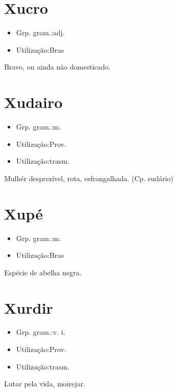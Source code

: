 \section{Xucro}
\begin{itemize}
\item {Grp. gram.:adj.}
\end{itemize}
\begin{itemize}
\item {Utilização:Bras}
\end{itemize}
Bravo, ou ainda não domesticado.
\section{Xudairo}
\begin{itemize}
\item {Grp. gram.:m.}
\end{itemize}
\begin{itemize}
\item {Utilização:Prov.}
\end{itemize}
\begin{itemize}
\item {Utilização:trasm.}
\end{itemize}
Mulhér desprezível, rota, esfrangalhada.
(Cp. \textunderscore sudário\textunderscore )
\section{Xupé}
\begin{itemize}
\item {Grp. gram.:m.}
\end{itemize}
\begin{itemize}
\item {Utilização:Bras}
\end{itemize}
Espécie de abelha negra.
\section{Xurdir}
\begin{itemize}
\item {Grp. gram.:v. i.}
\end{itemize}
\begin{itemize}
\item {Utilização:Prov.}
\end{itemize}
\begin{itemize}
\item {Utilização:trasm.}
\end{itemize}
Lutar pela vida, moirejar.
